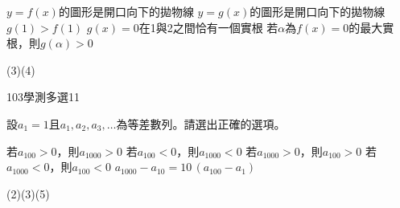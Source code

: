 \begin{QUESTIONS}
\begin{QUESTION}
\begin{QBODY}
\begin{QOPS}
			\QOP $y=f(x)$的圖形是開口向下的拋物線
			\QOP $y=g(x)$的圖形是開口向下的拋物線
			\QOP $g(1)>f(1)$
			\QOP $g(x)=0$在1與2之間恰有一個實根
			\QOP 若$\alpha $為$f(x)=0$的最大實根，則$g(\alpha )>0$
		\end{QOPS}
        \end{QBODY}
        \begin{QFROMS}
        \end{QFROMS}
        \begin{QTAGS}\end{QTAGS}
        \begin{QANS}
            (3)(4)
        \end{QANS}
        \begin{QSOLLIST}
        \end{QSOLLIST}
        \begin{QEMPTYSPACE}
        \end{QEMPTYSPACE}
    \end{QUESTION}
    \begin{QUESTION}
        \begin{ExamInfo}{103}{學測}{多選}{11}
        \end{ExamInfo}
        \begin{ExamAnsRateInfo}{50}{80}{50}{20}
        \end{ExamAnsRateInfo}
        \begin{QBODY}
			設${{a}_{1}}=1$且${{a}_{1}},{{a}_{2}},{{a}_{3}},\ldots $為等差數列。請選出正確的選項。
			\begin{QOPS}
				\QOP 若${{a}_{100}}>0$，則${{a}_{1000}}>0$
				\QOP 若${{a}_{100}}<0$，則${{a}_{1000}}<0$
				\QOP 若${{a}_{1000}}>0$，則${{a}_{100}}>0$
				\QOP 若${{a}_{1000}}<0$，則${{a}_{100}}<0$
				\QOP ${{a}_{1000}}-{{a}_{10}}=10\,({{a}_{100}}-{{a}_{1}})$
			\end{QOPS}
        \end{QBODY}
        \begin{QFROMS}
        \end{QFROMS}
        \begin{QTAGS}\end{QTAGS}
        \begin{QANS}
            (2)(3)(5)
        \end{QANS}
        \begin{QSOLLIST}
        \end{QSOLLIST}
        \begin{QEMPTYSPACE}
        \end{QEMPTYSPACE}

\end{QUESTION}
\end{QUESTIONS}
